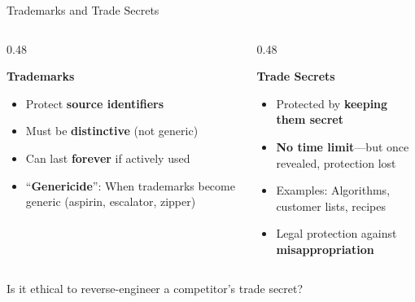 ﻿\documentclass[aspectratio=169,11pt]{beamer}
\begin{document}
\begin{frame}{Trademarks and Trade Secrets}
\begin{columns}[T]
\begin{column}{0.48\textwidth}
\begin{block}{\textbf{Trademarks}}
\begin{itemize}
    \item Protect \textbf{source identifiers}
    \item Must be \textbf{distinctive} (not generic)
    \item Can last \textbf{forever} if actively used
    \item ``\textbf{Genericide}'': When trademarks become generic (aspirin, escalator, zipper)
\end{itemize}
\end{block}
\end{column}

\begin{column}{0.48\textwidth}
\begin{block}{\textbf{Trade Secrets}}
\begin{itemize}
    \item Protected by \textbf{keeping them secret}
    \item \textbf{No time limit}---but once revealed, protection lost
    \item Examples: Algorithms, customer lists, recipes
    \item Legal protection against \textbf{misappropriation}
\end{itemize}
\end{block}
\end{column}
\end{columns}

\vspace{0.4cm}
\begin{discussionbox}[Discussion]
Is it ethical to reverse-engineer a competitor's trade secret?
\end{discussionbox}
\end{frame}
\end{document}
